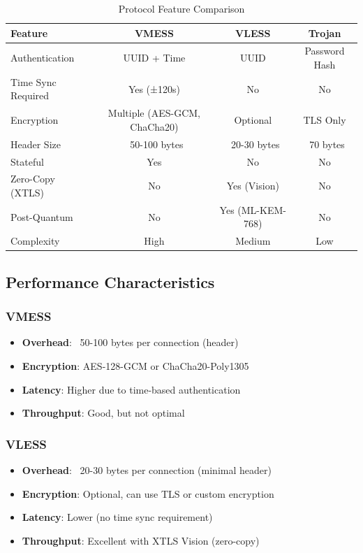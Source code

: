 \begin{table}[h]
\centering
\begin{tabular}{|l|c|c|c|}
\hline
\textbf{Feature} & \textbf{VMESS} & \textbf{VLESS} & \textbf{Trojan} \\
\hline
Authentication & UUID + Time & UUID & Password Hash \\
Time Sync Required & Yes (±120s) & No & No \\
Encryption & Multiple (AES-GCM, ChaCha20) & Optional & TLS Only \\
Header Size & ~50-100 bytes & ~20-30 bytes & ~70 bytes \\
Stateful & Yes & No & No \\
Zero-Copy (XTLS) & No & Yes (Vision) & No \\
Post-Quantum & No & Yes (ML-KEM-768) & No \\
Complexity & High & Medium & Low \\
\hline
\end{tabular}
\caption{Protocol Feature Comparison}
\end{table}

\subsection{Performance Characteristics}

\subsubsection{VMESS}
\begin{itemize}
    \item \textbf{Overhead}: ~50-100 bytes per connection (header)
    \item \textbf{Encryption}: AES-128-GCM or ChaCha20-Poly1305
    \item \textbf{Latency}: Higher due to time-based authentication
    \item \textbf{Throughput}: Good, but not optimal
\end{itemize}

\subsubsection{VLESS}
\begin{itemize}
    \item \textbf{Overhead}: ~20-30 bytes per connection (minimal header)
    \item \textbf{Encryption}: Optional, can use TLS or custom encryption
    \item \textbf{Latency}: Lower (no time sync requirement)
    \item \textbf{Throughput}: Excellent with XTLS Vision (zero-copy)
\end{itemize}

